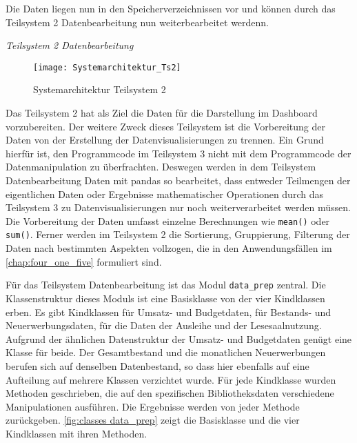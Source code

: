     Die Daten liegen nun in den Speicherverzeichnissen vor und können durch das Teilsystem 2 Datenbearbeitung 
    nun weiterbearbeitet werdenn.
    
    \clearpage
    \noindent
    \textit{Teilsystem 2 Datenbearbeitung}

    \begin{figure}[H]
        \centering
            \texttt{[image: Systemarchitektur\_Ts2]}
            \caption{Systemarchitektur Teilsystem 2}
            \label{fig:Systemarchitektur Teilsystem 2}
    \end{figure}

    Das Teilsystem 2 hat als Ziel die Daten für die Darstellung im Dashboard vorzubereiten. Der weitere Zweck dieses
    Teilsystem ist die Vorbereitung der Daten von der Erstellung der Datenvisualisierungen zu trennen. Ein Grund hierfür
    ist, den Programmcode im Teilsystem 3 nicht mit dem Programmcode der Datenmanipulation zu überfrachten. 
    Deswegen werden in dem Teilsystem Datenbearbeitung Daten mit pandas so bearbeitet, 
    dass entweder Teilmengen der eigentlichen Daten oder Ergebnisse mathematischer Operationen durch das Teilsystem 3 
    zu Datenvisualisierungen nur noch weiterverarbeitet werden müssen. Die Vorbereitung der Daten umfasst einzelne Berechnungen 
    wie \texttt{mean()} oder \texttt{sum()}. Ferner werden im Teilsystem 2 die Sortierung, Gruppierung, Filterung der 
    Daten nach bestimmten Aspekten vollzogen, die in den Anwendungsfällen im \autoref{chap:four_one_five} formuliert sind.
    
    Für das Teilsystem Datenbearbeitung ist das Modul \texttt{data\_prep} zentral. Die Klassenstruktur dieses Moduls ist eine 
    Basisklasse von der vier Kindklassen erben. Es gibt Kindklassen für Umsatz- und Budgetdaten, für Bestands- und Neuerwerbungsdaten, für die Daten der Ausleihe und 
    der Lesesaalnutzung. Aufgrund der ähnlichen Datenstruktur der Umsatz- und Budgetdaten genügt eine Klasse für beide.
    Der Gesamtbestand und die monatlichen Neuerwerbungen berufen sich auf denselben Datenbestand, so dass hier ebenfalls auf eine Aufteilung auf mehrere Klassen verzichtet wurde.
    Für jede Kindklasse wurden Methoden geschrieben, die auf den spezifischen Bibliotheksdaten verschiedene Manipulationen ausführen.
    Die Ergebnisse werden von jeder Methode zurückgeben. \autoref{fig:classes data_prep} zeigt die Basisklasse und die vier Kindklassen mit ihren Methoden.


